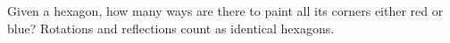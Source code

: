 Given a hexagon, how many ways are there to paint all its corners either red or blue? Rotations and reflections count as identical hexagons.
